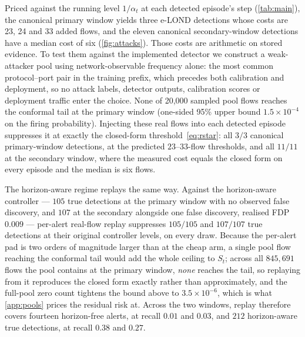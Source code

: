\documentclass[conference]{IEEEtran}
\newcommand{\alphat}{\alpha_t}
\begin{document}
Priced against the running level $1/\alphat$ at each detected episode's step (\cref{tab:main}), the
canonical primary window yields three e-LOND detections whose costs are 23, 24 and 33 added flows, and
the eleven canonical secondary-window detections have a median cost of six (\cref{fig:attacks}). Those
costs are arithmetic on stored evidence. To test them against the implemented detector we construct a
weak-attacker pool using network-observable frequency alone: the most common protocol--port pair in
the training prefix, which precedes both calibration and deployment, so no attack labels, detector
outputs, calibration scores or deployment traffic enter the choice. None of 20,000 sampled pool flows
reaches the conformal tail at the primary window (one-sided 95\% upper bound $1.5\times10^{-4}$ on the
firing probability). Injecting these real flows into each detected episode suppresses it at exactly
the closed-form threshold~\eqref{eq:rstar}: all $3/3$ canonical primary-window detections, at the
predicted $23$--$33$-flow thresholds, and all $11/11$ at the secondary window, where the measured cost
equals the closed form on every episode and the median is six flows.

The horizon-aware regime replays the same way. Against the horizon-aware controller --- $105$ true
detections at the primary window with no observed false discovery, and $107$ at the secondary
alongside one false discovery, realised FDP $0.009$ --- per-alert real-flow replay suppresses
$105/105$ and $107/107$ true detections at their original controller levels, on every draw. Because
the per-alert pad is two orders of magnitude larger than at the cheap arm, a single pool flow reaching the
conformal tail would add the whole ceiling to $S_t$; across all $845{,}691$ flows the pool contains at
the primary window, \emph{none} reaches the tail, so replaying from it reproduces the closed form
exactly rather than approximately, and the full-pool zero count tightens the bound above to
$3.5\times10^{-6}$, which is what \cref{app:pools} prices the residual risk at. Across the two windows, replay therefore covers fourteen horizon-free alerts, at recall
$0.01$ and $0.03$, and $212$ horizon-aware true detections, at recall $0.38$ and $0.27$.
\end{document}
